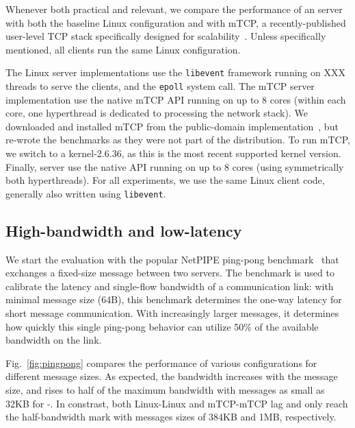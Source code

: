 

%



Whenever both practical and relevant, we compare the performance of an
\ix server with both the baseline Linux configuration and with mTCP, a
recently-published user-level TCP stack specifically designed for
scalability~\cite{jeong2014mtcp}.  Unless specifically mentioned, all
clients run the same Linux configuration. 

The Linux server implementations use the \texttt{libevent} framework
running on XXX threads to serve the clients, and the \texttt{epoll} system call. The mTCP server
implementation use the native mTCP API running on up to 8 cores
(within each core, one hyperthread is dedicated to processing the
network stack).  We downloaded and installed mTCP
from the public-domain implementation~\cite{url:mtcp}, but re-wrote the
benchmarks as they were not part of the distribution.  To run mTCP, we
switch to a kernel-2.6.36, as this is the most recent supported kernel
version.
Finally, \ix server use
the native \ix API running on up to 8 cores (using symmetrically both
hyperthreads).  For all experiments, we use the same Linux client code, generally also written using \texttt{libevent}.


\subsection{High-bandwidth and low-latency}
\label{sec:eval:netpipe}


We start the evaluation with the popular NetPIPE ping-pong
benchmark~\cite{snell1996netpipe} that exchanges a fixed-size message
between two servers.  The benchmark is used to calibrate the latency
and single-flow bandwidth of a communication link: with minimal
message size (64B), this benchmark determines the one-way latency for
short message communication.  With increasingly larger messages, it
determines how quickly this single ping-pong behavior can utilize 50\%
of the available bandwidth on the link.


Fig.~\ref{fig:pingpong} compares the performance of various
configurations for different message sizes.  As expected, the
bandwidth increases with the message size, and rises to half of the
maximum bandwidth with messages as small as 32KB for \ix-\ix.  In
constrast, both Linux-Linux and mTCP-mTCP lag and only reach the
half-bandwidth mark with messages sizes of 384KB and 1MB,
respectively.  

